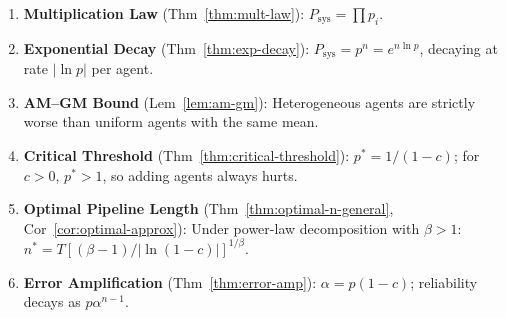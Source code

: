 \begin{enumerate}
  \item \textbf{Multiplication Law} (Thm~\ref{thm:mult-law}):
    $P_{\mathrm{sys}} = \prod p_i$.

  \item \textbf{Exponential Decay} (Thm~\ref{thm:exp-decay}):
    $P_{\mathrm{sys}} = p^n = e^{n\ln p}$, decaying at rate $|\ln p|$ per agent.

  \item \textbf{AM--GM Bound} (Lem~\ref{lem:am-gm}):
    Heterogeneous agents are strictly worse than uniform agents with the same mean.

  \item \textbf{Critical Threshold} (Thm~\ref{thm:critical-threshold}):
    $p^* = 1/(1-c)$; for $c > 0$, $p^* > 1$, so adding agents always hurts.

  \item \textbf{Optimal Pipeline Length} (Thm~\ref{thm:optimal-n-general},
    Cor~\ref{cor:optimal-approx}):
    Under power-law decomposition with $\beta > 1$:
    $n^* = T[(\beta-1)/|\ln(1-c)|]^{1/\beta}$.

  \item \textbf{Error Amplification} (Thm~\ref{thm:error-amp}):
    $\alpha = p(1-c)$; reliability decays as $p\alpha^{n-1}$.
\end{enumerate}
